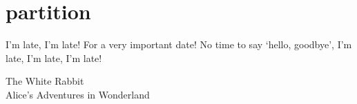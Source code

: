 \chapter{partition}

\epigraph{I’m late, I’m late! For a very important date! No time to say ‘hello, goodbye’, I’m late, I’m late, I’m late!}{The White Rabbit \\ Alice's Adventures in Wonderland}


